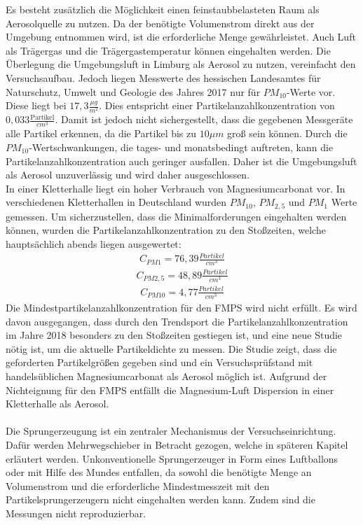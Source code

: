 Es besteht zus\"{a}tzlich die M\"{o}glichkeit einen feinstaubbelasteten Raum als Aerosolquelle zu nutzen. Da der ben\"{o}tigte Volumenstrom direkt aus der Umgebung entnommen wird, ist die erforderliche Menge gew\"{a}hrleistet. Auch Luft als Tr\"{a}gergas und die Tr\"{a}gergastemperatur k\"{o}nnen eingehalten werden. Die \"{U}berlegung die Umgebungsluft in Limburg als Aerosol zu nutzen, vereinfacht den Versuchsaufbau. Jedoch liegen Messwerte des hessischen Landesamtes f\"{u}r Naturschutz, Umwelt und Geologie des Jahres 2017 nur f\"{u}r \(PM_{10}\)-Werte vor. Diese liegt bei \(17,3 \frac{\mu g}{m^2}\). Dies entspricht einer Partikelanzahlkonzentration von \(0,033 \frac{\text{Partikel}}{cm^3}\)\cite{hlnug}. Damit ist jedoch nicht sichergestellt, dass die gegebenen Messger\"{a}te alle Partikel erkennen, da die Partikel bis zu \(10 \mu m\) gro{\ss} sein k\"{o}nnen. Durch die \(PM_{10}\)-Wertschwankungen, die tages- und monatsbedingt auftreten, kann die Partikelanzahlkonzentration auch geringer ausfallen. Daher ist die Umgebungsluft als Aerosol unzuverl\"{a}ssig und wird daher ausgeschlossen.\\
In einer Kletterhalle liegt ein hoher Verbrauch von Magnesiumcarbonat vor. In verschiedenen Kletterhallen in Deutschland wurden \(PM_{10}\), \(PM_{2,5}\) und \(PM_1\) Werte gemessen\cite{exp}. Um sicherzustellen, dass die Minimalforderungen eingehalten werden k\"{o}nnen, wurden die Partikelanzahlkonzentration zu den Sto{\ss}zeiten, welche haupts\"{a}chlich abends liegen ausgewertet:
\begin{align*}
C_{PM 1} = 76,39 \frac{\textit{Partikel}}{cm^3}
\end{align*}
\begin{align*}
C_{PM 2,5} = 48,89 \frac{\textit{Partikel}}{cm^3}
\end{align*}
\begin{align*}
C_{PM 10} = 4,77 \frac{\textit{Partikel}}{cm^3}
\end{align*}
Die Mindestpartikelanzahlkonzentration f\"{u}r den FMPS wird nicht erf\"{u}llt. Es wird davon ausgegangen, dass durch den Trendsport die Partikelanzahlkonzentration im Jahre 2018 besonders zu den Sto{\ss}zeiten gestiegen ist, und eine neue Studie n\"{o}tig ist, um die aktuelle Partikeldichte zu messen. Die Studie zeigt, dass die geforderten Partikelgr\"{o}{\ss}en gegeben sind und ein Versuchspr\"{u}fstand mit handels\"{u}blichen Magnesiumcarbonat als Aerosol m\"{o}glich ist. Aufgrund der Nichteignung f\"{u}r den FMPS entf\"{a}llt die Magnesium-Luft Dispersion in einer Kletterhalle als Aerosol.
\\\\
Die Sprungerzeugung ist ein zentraler Mechanismus der Versuchseinrichtung. Daf\"{u}r werden Mehrwegschieber in Betracht gezogen, welche in sp\"{a}teren Kapitel erl\"{a}utert werden. Unkonventionelle Sprungerzeuger in Form eines Luftballons oder mit Hilfe des Mundes entfallen, da sowohl die ben\"{o}tigte Menge an Volumenstrom und die erforderliche Mindestmesszeit mit den Partikelsprungerzeugern nicht eingehalten werden kann. Zudem sind die Messungen nicht reproduzierbar.